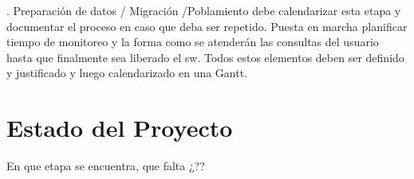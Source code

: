 .
Preparación de datos / Migración /Poblamiento debe calendarizar esta etapa y documentar el proceso en caso que deba ser repetido.
Puesta en marcha planificar tiempo de monitoreo y la forma como se atenderán las consultas del usuario hasta que finalmente sea liberado el sw.
Todos estos elementos deben ser definido y justificado y luego calendarizado en una Gantt.


\section{Estado del Proyecto}

En que etapa se encuentra, que falta ¿??